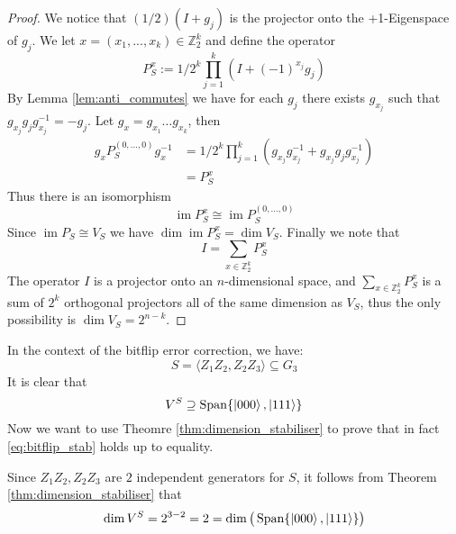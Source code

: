 \documentclass[12pt]{article}
\theoremstyle{plain}
\theoremstyle{definition}
\newcommand{\bb}[1]{\mathbb{#1}}
\begin{document}
	\begin{proof}
		We notice that $(1/2)(I + g_j)$ is the projector onto the +1-Eigenspace of $g_j$. We let $x = (x_1,...,x_k) \in \bb{Z}_2^k$ and define the operator
		\begin{equation}
			P_S^x := 1/2^{k}\prod_{j = 1}^k(I + (-1)^{x_{j}}g_j)
		\end{equation}
		By Lemma \ref{lem:anti_commutes} we have for each $g_j$ there exists $g_{x_j}$ such that $g_{x_j}g_j g_{x_j}^{-1} = -g_j$. Let $g_x = g_{x_1}\hdots g_{x_k}$, then
		\begin{align*}
			g_xP_S^{(0,...,0)} g_x^{-1} &= 1/2^k\prod_{j = 1}^k (g_{x_j}g_{x_j}^{-1} + g_{x_j} g_{j}g_{x_j}^{-1})\\
			&= P_S^x
		\end{align*}
		Thus there is an isomorphism
		\begin{equation}
			\operatorname{im}P_S^x \cong \operatorname{im}P_S^{(0,...,0)}
		\end{equation}
		Since $\operatorname{im}P_S \cong V_S$ we have $\operatorname{dim}\operatorname{im}P_S^x = \operatorname{dim}V_S$. Finally we note that
		\begin{equation}
			I = \sum_{x \in \bb{Z}_2^k}P_S^x
		\end{equation}
		The operator $I$ is a projector onto an $n$-dimensional space, and $\sum_{x \in \bb{Z}_2^k}P_S^x$ is a sum of $2^k$ orthogonal projectors all of the same dimension as $V_S$, thus
		the only possibility is $\operatorname{dim}V_S = 2^{n - k}$.
	\end{proof}

\begin{application}
	In the context of the bitflip error correction, we have:
	\begin{equation}
		S = \langle Z_1Z_2, Z_2Z_3 \rangle \subseteq G_3
		\end{equation}
	It is clear that
	\begin{equation}\label{eq:bitflip_stab}
		V^S \supseteq \operatorname{Span}\{ \ket{000}, \ket{111} \}
		\end{equation}
	Now we want to use Theomre \ref{thm:dimension_stabiliser} to prove that in fact \eqref{eq:bitflip_stab} holds up to equality.
	
	Since $Z_1Z_2, Z_2Z_3$ are $2$ independent generators for $S$, it follows from Theorem \ref{thm:dimension_stabiliser} that
	\begin{equation}
		\operatorname{dim}V^S = 2^{3 - 2} = 2 = \operatorname{dim}\big(\operatorname{Span}\{ \ket{000}, \ket{111} \}\big)
		\end{equation}
	\end{application}
\end{document}

